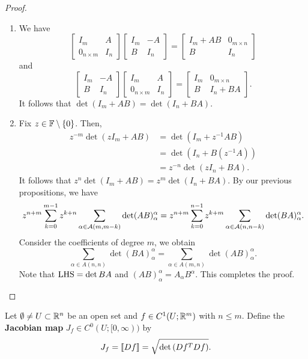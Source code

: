 \documentclass[a4paper]{article}
\begin{document}
\begin{proof}
\begin{enumerate}
\item We have 
\[
\begin{bmatrix}
  I_m & A \\
  0_{n \times m} & I_n
\end{bmatrix} 
\begin{bmatrix}
  I_m & - A \\ 
  B & I_n
\end{bmatrix}
= \begin{bmatrix}
  I_m + AB & 0_{m \times n} \\
  B & I_n
\end{bmatrix}
\]
and 
\[
\begin{bmatrix}
  I_m & -A \\
  B & I_n
\end{bmatrix}
\begin{bmatrix}
  I_m & A \\  
  0_{n \times m} & I_n 
\end{bmatrix}
= \begin{bmatrix}
  I_m & 0_{m \times n} \\
  B & I_n + BA
\end{bmatrix}.
\]
It follows that $\det(I_m + AB) = \det(I_n + BA)$.

\item Fix $z \in \mathbb{F} \setminus \left\{ 0 \right\}$. 
Then, 
\[
\begin{aligned}
  z^{-m} \det(z I_m + AB) 
  &= \det(I_m + z^{-1} AB)  \\
  &= \det(I_n + B (z^{-1} A)) \\
  &= z^{-n} \det(z I_n + BA).
\end{aligned}
\]
It follows that $z^n \det(I_m + AB) = 
z^m \det(I_n + BA)$. By our previous propositions, 
we have 
\[
z^{n+m} \sum_{k=0}^{m-1} 
z^{k+n} \sum_{\alpha \in \mathcal{A}(m, m-k)} \det(AB)_\alpha^\alpha 
= z^{n + m} \sum_{k=0}^{n-1} z^{k+m} 
\sum_{\alpha \in \mathcal{A}(n, n - k)} \det (BA)_\alpha^\alpha.
\]
Consider the coefficients of degree $m$, we obtain 
\[
\sum_{\alpha \in A(n, n)} \det(BA)_\alpha^\alpha 
= \sum_{\alpha \in A(m, n)} \det(AB)_\alpha^\alpha.
\]
Note that $\operatorname{LHS} = \det BA$ and $(AB)_\alpha^\alpha = 
A_\alpha B^\alpha$. This completes the proof.
\end{enumerate}
\end{proof}

\begin{defi}
Let $\emptyset \neq U \subset \mathbb{R}^n$ be an open set and 
$f \in C^1 (U; \mathbb{R}^m)$ with $n \leq m$. Define the 
\textbf{Jacobian map} $J_f \in C^0 (U; [0, \infty))$
by 
\[
J_f = \left\llbracket Df \right\rrbracket = \sqrt{\det \left( Df^T Df \right)}.
\]
\end{defi}
\end{document}
